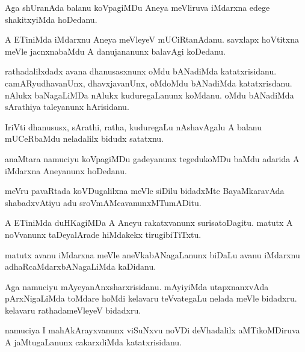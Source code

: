 \documentclass{article}
\begin{document}
\begin{mng}%
Aga shUranAda balanu koVpagiMDu Aneya meVliruva iMdarxna edege shakitxyiMda hoDedanu.
\end{mng}

\begin{mng}%
A ETiniMda iMdarxnu Aneya meVleyeV mUCiRtanAdanu. savxlapx hoVtitxna meVle jacnxnabaMdu A 
danujananunx balavAgi koDedanu.
\end{mng}

\begin{mng}%
rathadalilxdadx avana dhanusasxnunx oMdu bANadiMda katatxrisidanu. camARyudhavanUnx, dhavxjavanUnx, 
oMdoMdu bANadiMda katatxrisdanu. nAlukx baNagaLiMDa nAlukx kuduregaLanunx koMdanu. oMdu bANadiMda 
sArathiya taleyanunx hArisidanu.
\end{mng}

\begin{mng}%
IriVti dhanususx, sArathi, ratha, kuduregaLu nAshavAgalu A balanu mUCeRbaMdu neladalilx bidudx 
satatxnu.
\end{mng}

\begin{mng}%
anaMtara namuciyu koVpagiMDu gadeyanunx tegedukoMDu baMdu adarida A iMdarxna Aneyanunx hoDedanu.
\end{mng}

\begin{mng}%
meVru pavaRtada koVDugalilxna meVle siDilu bidadxMte BayaMkaravAda shabadxvAtiyu adu 
sroVmAMcavanunxMTumADitu.
\end{mng}

\begin{mng}%
A ETiniMda duHKagiMDa A Aneyu rakatxvanunx surisatoDagitu. matutx A noVvanunx taDeyalArade 
hiMdakekx tirugibiTiTxtu.
\end{mng}

\begin{mng}%
matutx avanu iMdarxna meVle aneVkabANagaLanunx biDaLu avanu iMdarxnu adhaRcaMdarxbANagaLiMda kaDidanu.
\end{mng}

\begin{mng}%
Aga namuciyu mAyeyanAnxsharxrisidanu. mAyiyiMda utapxnanxvAda pArxNigaLiMda toMdare hoMdi kelavaru 
teVvategaLu nelada meVle bidadxru. kelavaru rathadameVleyeV bidadxru.
\end{mng}

\begin{mng}%
namuciya I mahAkArayxvanunx viSuNxvu noVDi deVhadalilx aMTikoMDiruva A jaMtugaLanunx cakarxdiMda 
katatxrisidanu.
\end{mng}
\end{document}

